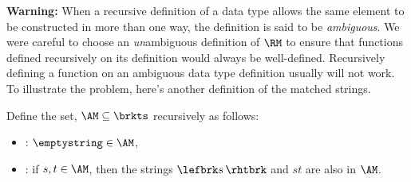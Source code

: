 \iffalse

The \term{depth} of a matched string is defined recursively as follows
\begin{definition}
The \emph{depth} $d(s)$ of a string $s \in\RM$ is defined
recursively by the rules:
\begin{itemize}
\item $d(\emptystring) \eqdef\  0.$
\item $d(\lefbrk s\,\rhtbrk t)
    \eqdef\ \max \set{d(s) + 1, d(t)}$
\end{itemize}
\end{definition}
\fi

\textbf{Warning:}%
When a recursive definition of a data type allows
the same element to be constructed in more than one way, the
definition is said to be \emph{ambiguous}.  We were careful to choose
an \emph{un}ambiguous definition of $\RM$ to ensure that functions
defined recursively on its definition would always be well-defined.
Recursively defining a function on an ambiguous data type
definition usually will not work.  To illustrate the problem, here's
another definition of the matched strings.

\iffalse Recursive definitions of tagged data types, where the tag
uniquely determines the rule used to construct an element, are guaranteed
to be unambiguous.
\fi

\begin{definition}
\label{AM_def}
Define the set, $\AM \subseteq \brkts$ recursively as follows:
\begin{itemize}

\item {}: $\emptystring \in \AM$,

\item {}: if $s,t \in \AM$, then
  the strings $\lefbrk s\, \rhtbrk$ and $st$ are also in $\AM$.
\end{itemize}
\end{definition}

